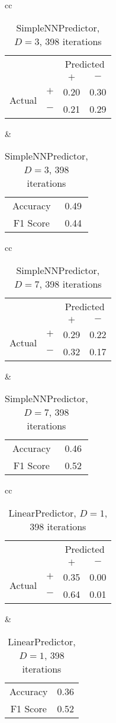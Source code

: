 \documentclass[twocolumn,10pt]{asme2ej}
\begin{document}
\begin{table}
  \begin{tabular}{cc}
    \begin{tabular}{cc|cc}
      & & \multicolumn{2}{c}{Predicted} \\
      & & $+ $ & $-$ \\
      \hline
      \multirow{2}{*}{Actual}
      & $+$ & 0.20 & 0.30 \\
      & $-$ & 0.21 & 0.29 \\
      \hline
    \end{tabular}
    &
    \begin{tabular}{cc}
      Accuracy & 0.49 \\
      F1 Score & 0.44 \\
    \end{tabular}
  \end{tabular}
  \caption{SimpleNNPredictor, $D=3$, 398 iterations}
  \label{pred-perf-SimpleNNPredictor-3-398}
\end{table}


\begin{table}
  \begin{tabular}{cc}
    \begin{tabular}{cc|cc}
      & & \multicolumn{2}{c}{Predicted} \\
      & & $+ $ & $-$ \\
      \hline
      \multirow{2}{*}{Actual}
      & $+$ & 0.29 & 0.22 \\
      & $-$ & 0.32 & 0.17 \\
      \hline
    \end{tabular}
    &
    \begin{tabular}{cc}
      Accuracy & 0.46 \\
      F1 Score & 0.52 \\
    \end{tabular}
  \end{tabular}
  \caption{SimpleNNPredictor, $D=7$, 398 iterations}
  \label{pred-perf-SimpleNNPredictor-7-398}
\end{table}


\begin{table}
  \begin{tabular}{cc}
    \begin{tabular}{cc|cc}
      & & \multicolumn{2}{c}{Predicted} \\
      & & $+ $ & $-$ \\
      \hline
      \multirow{2}{*}{Actual}
      & $+$ & 0.35 & 0.00 \\
      & $-$ & 0.64 & 0.01 \\
      \hline
    \end{tabular}
    &
    \begin{tabular}{cc}
      Accuracy & 0.36 \\
      F1 Score & 0.52 \\
    \end{tabular}
  \end{tabular}
  \caption{LinearPredictor, $D=1$, 398 iterations}
  \label{pred-perf-LinearPredictor-1-398}
\end{table}
\end{document}
